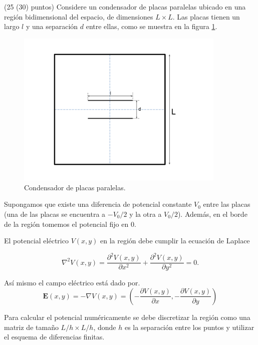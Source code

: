 \documentclass[11pt,letterpaper]{exam}
\begin{document}
\begin{questions}





(25 (30) puntos) Considere un condensador de placas paralelas ubicado
en una regi\'on bidimensional del espacio, de dimensiones $L\times
L$. Las placas tienen un largo $l$ y una separaci\'on $d$ entre ellas, como se
muestra en la figura \ref{fig:gridplates}. 

\begin{figure}[H]
  \centering
  \includegraphics[width=10cm]{gridplates}
  \caption{\label{fig:gridplates} Condensador de placas paralelas.}
\end{figure}

Supongamos que existe una diferencia de potencial constante $V_0$
entre las placas (una de las placas se encuentra a $-V_0/2$ y la otra
a $V_0/2$). Adem\'as, en el borde de la regi\'on tomemos el potencial
fijo en $0$. 

El potencial el\'ectrico $V(x,y)$ en la regi\'on debe cumplir la
ecuaci\'on de Laplace 

\begin{equation}
 \nabla^2V(x,y) = \frac{\partial^2 V(x,y)}{\partial x^2} +
 \frac{\partial^2 V(x,y)}{\partial y^2}=0. 
\end{equation}

As\'i mismo el campo el\'ectrico est\'a dado por.
\begin{equation}
\mathbf{E}(x,y) = -\nabla V(x,y) = \left(-\frac{\partial V(x,y)}{\partial x}, -\frac{\partial V(x,y)}{\partial y}\right)
\end{equation}

Para calcular el potencial num\'ericamente se debe discretizar la
regi\'on como una matriz de tama\~no $L/h \times L/h$, donde $h$ es la
separaci\'on entre los puntos y utilizar el esquema de diferencias
finitas. 


\end{questions}
\end{document}
